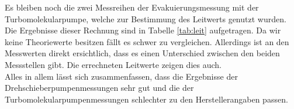 \noindent
Es bleiben noch die zwei Messreihen der Evakuierungsmessung mit der Turbomolekularpumpe, welche zur Bestimmung des Leitwerts genutzt wurden.
Die Ergebnisse dieser Rechnung sind in Tabelle \ref{tab:leit} aufgetragen.
Da wir keine Theoriewerte besitzen fällt es schwer zu vergleichen. Allerdings ist an den Messwerten direkt ersichtlich, dass es einen Unterschied zwischen den beiden Messstellen gibt.
Die errechneten Leitwerte zeigen dies auch.\\
Alles in allem lässt sich zusammenfassen, dass die Ergebnisse der Drehschieberpumpenmessungen sehr gut und die der Turbomolekularpumpenmessungen schlechter zu den Herstellerangaben passen.
\newpage